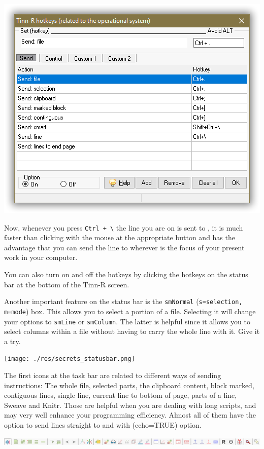 \includegraphics[scale=0.50]{./res/hotkeys_send.png}

Now, whenever you press \texttt{Ctrl + \textbackslash{}} the line you are on is sent to \RR{},
it is much faster than clicking with the mouse at the appropriate button and has the advantage
that you can send the line to \RR{} wherever is the focus of your present work in your computer.

You can also turn on and off the hotkeys by clicking the hotkeys on the status bar at the bottom of the Tinn-R screen.

Another important feature on the status bar is the \texttt{smNormal} (\texttt{s=selection, m=mode}) box.
This allows you to select a portion of a file.
Selecting it will change your options to \texttt{smLine} or \texttt{smColumn}.
The latter is helpful since it allows you to select columns within a file without having to carry the whole line with it.
Give it a try.

\texttt{[image: ./res/secrets\_statusbar.png]}

The first icons at the \RR{} task bar are related to different ways of sending instructions:
The whole file, selected parts, the clipboard content, block marked, contiguous lines, single line,
current line to bottom of page, parts of a line, Sweave and Knitr.
Those are helpful when you are dealing with long scripts,
and may very well enhance your programming efficiency.
Almost all of them have the option to send lines straight to \RR{} and with (echo=TRUE) option.

\includegraphics[scale=0.50]{./res/secrets_rtoolbar.png}
